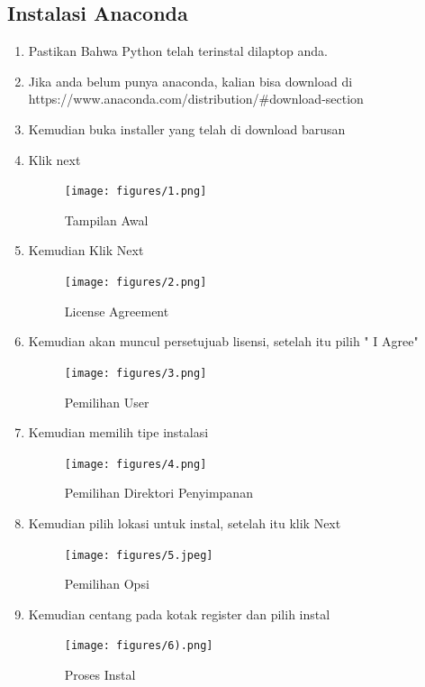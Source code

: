 \subsection{Instalasi Anaconda}
\begin{enumerate}
    \item Pastikan Bahwa Python telah terinstal dilaptop anda.
    \item Jika anda belum punya anaconda, kalian bisa download di https://www.anaconda.com/distribution/#download-section
    \item Kemudian buka installer yang telah di download barusan
    \item Klik next
    \begin{figure}[!htbp]
        \centering
        \texttt{[image: figures/1.png]}
        \caption{Tampilan Awal}
        \label{awal}
        \end{figure}

    \item Kemudian Klik Next
    \begin{figure}[!htbp]
        \centering
        \texttt{[image: figures/2.png]}
        \caption{License Agreement}
        \label{License}
        \end{figure}

    \item Kemudian akan muncul persetujuab lisensi, setelah itu pilih " I Agree"
    \begin{figure}[!htbp]
        \centering
        \texttt{[image: figures/3.png]}
        \caption{Pemilihan User}
        \label{User}
        \end{figure}

    \item Kemudian memilih tipe instalasi
    \begin{figure}[!htbp]
        \centering
        \texttt{[image: figures/4.png]}
        \caption{Pemilihan Direktori Penyimpanan}
        \label{Directory}
        \end{figure}

    \item Kemudian pilih lokasi untuk instal, setelah itu klik Next
    \begin{figure}[!htbp]
        \centering
        \texttt{[image: figures/5.jpeg]}
        \caption{Pemilihan Opsi}
        \label{opsi}
        \end{figure}

    \item Kemudian centang pada kotak register dan pilih instal
    \begin{figure}[!htbp]
        \centering
        \texttt{[image: figures/6).png]}
        \caption{Proses Instal}
        \label{Proses}
        \end{figure}


\end{enumerate}
